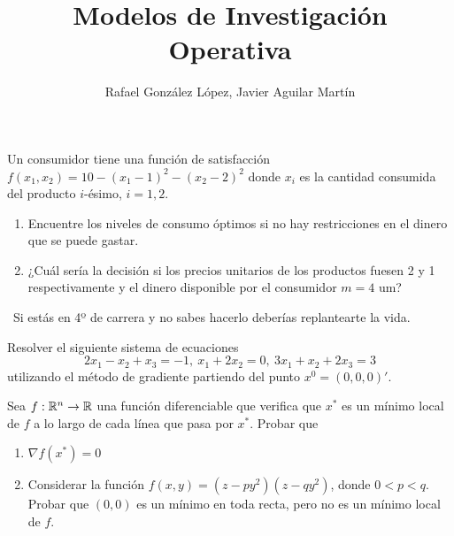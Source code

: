 \documentclass[twoside]{article}
\begin{document}
\title{Modelos de Investigación Operativa}
\author{Rafael González López, Javier Aguilar Martín}
\maketitle

\begin{ejercicio}{1}
Un consumidor tiene una función de satisfacción $f(x_1,x_2)=10-(x_1-1)^2-(x_2-2)^2$ donde $x_i$ es la cantidad consumida del producto $i$-ésimo, $i=1,2$.
\begin{enumerate}
\item Encuentre los niveles de consumo óptimos si no hay restricciones en el dinero que se puede gastar.
\item ¿Cuál sería la decisión si los precios unitarios de los productos fuesen 2 y 1 respectivamente y el dinero disponible por el consumidor $m=4$ um?
\end{enumerate}
\begin{solucion}\
Si estás en 4º de carrera y no sabes hacerlo deberías replantearte la vida.
\end{solucion}
\end{ejercicio}

\newpage 
\begin{ejercicio}{2}
Resolver el siguiente sistema de ecuaciones
\[
2x_1-x_2+x_3=-1,\ x_1+2x_2=0,\ 3x_1+x_2+2x_3=3
\]
utilizando el método de gradiente partiendo del punto $x^0=(0,0,0)'$.
\begin{solucion}

\end{solucion}

\end{ejercicio}

\newpage 

\begin{ejercicio}{3}
Sea $f:\mathbb{R}^n\to\mathbb{R}$ una función diferenciable que verifica que $x^*$ es un mínimo local de $f$ a lo largo de cada línea que pasa por $x^*$. Probar que 
\begin{enumerate}
\item $\nabla f(x^*)=0$
\item Considerar la función $f(x,y)=(z-py^2)(z-qy^2)$, donde $0<p<q$. Probar que $(0,0)$ es un mínimo en toda recta, pero no es un mínimo local de $f$.
\end{enumerate}

\begin{solucion}\
\end{solucion}
\end{ejercicio}
\end{document}
